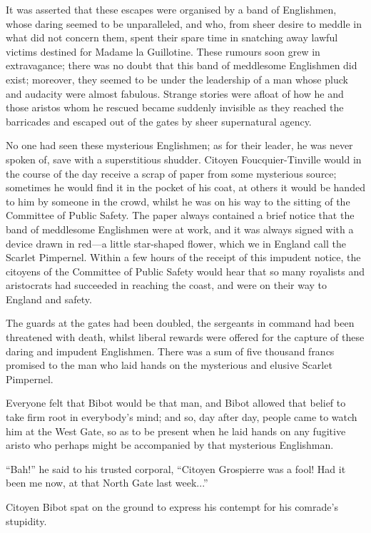 \documentclass[paper=a5,BCOR=7mm,twoside,DIV=calc,12pt,usegeometry,chapterprefix,endperiod,headings=big]{scrbook}
\begin{document}
It was asserted that these escapes were organised by a band of Englishmen, whose daring seemed to be unparalleled, and who, from sheer desire to meddle in what did not concern them, spent their spare time in snatching away lawful victims destined for Madame la Guillotine. These rumours soon grew in extravagance; there was no doubt that this band of meddlesome Englishmen did exist; moreover, they seemed to be under the leadership of a man whose pluck and audacity were almost fabulous. Strange stories were afloat of how he and those aristos whom he rescued became suddenly invisible as they reached the barricades and escaped out of the gates by sheer supernatural agency.

No one had seen these mysterious Englishmen; as for their leader, he was never spoken of, save with a superstitious shudder. Citoyen Foucquier-Tinville would in the course of the day receive a scrap of paper from some mysterious source; sometimes he would find it in the pocket of his coat, at others it would be handed to him by someone in the crowd, whilst he was on his way to the sitting of the Committee of Public Safety. The paper always contained a brief notice that the band of meddlesome Englishmen were at work, and it was always signed with a device drawn in red---a little star-shaped flower, which we in England call the Scarlet Pimpernel. Within a few hours of the receipt of this impudent notice, the citoyens of the Committee of Public Safety would hear that so many royalists and aristocrats had succeeded in reaching the coast, and were on their way to England and safety.

The guards at the gates had been doubled, the sergeants in command had been threatened with death, whilst liberal rewards were offered for the capture of these daring and impudent Englishmen. There was a sum of five thousand francs promised to the man who laid hands on the mysterious and elusive Scarlet Pimpernel.

Everyone felt that Bibot would be that man, and Bibot allowed that belief to take firm root in everybody's mind; and so, day after day, people came to watch him at the West Gate, so as to be present when he laid hands on any fugitive aristo who perhaps might be accompanied by that mysterious Englishman.

\enquote{Bah!} he said to his trusted corporal, \enquote{Citoyen Grospierre was a fool! Had it been me now, at that North Gate last week...}

Citoyen Bibot spat on the ground to express his contempt for his comrade's stupidity.
\end{document}
